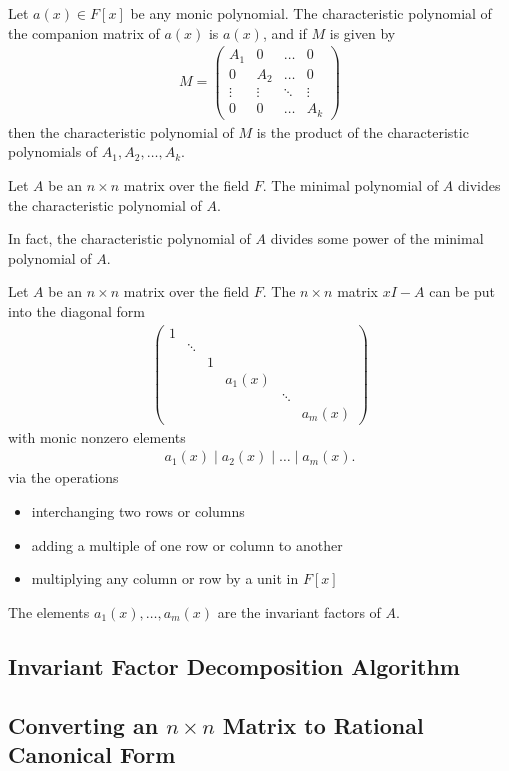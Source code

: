 \documentclass{memoir}
\begin{document}
\begin{lemma}
	Let \(a(x) \in F[x]\) be any monic polynomial. The characteristic polynomial of the companion matrix of \(a(x)\) is \(a(x)\), and if  \(M\) is given by
	\begin{align*}
		M = 
		\begin{pmatrix}
			A_1 & 0 & \ldots & 0 \\
			0 & A_2 & \ldots & 0\\
			\vdots & \vdots & \ddots & \vdots \\
			0 & 0 & \ldots & A_k
		\end{pmatrix} 
	\end{align*}
	then the characteristic polynomial of \(M\) is the product of the characteristic polynomials of \(A_1,A_2,\ldots,A_k\).
\end{lemma}

\begin{thm}
	Let \(A\) be an \(n\times n\) matrix over the field \(F\). The minimal polynomial of \(A\) divides the characteristic polynomial of \(A\).
\end{thm}
In fact, the characteristic polynomial of \(A\) divides some power of the minimal polynomial of \(A\).

\begin{thm}
	Let \(A\) be an \(n\times n\) matrix over the field \(F\). The \(n\times n\) matrix \(xI - A\) can be put into the diagonal form
	\begin{align*}
		\begin{pmatrix} 
			1 & & & & &\\
			  & \ddots & & & &\\
			  & & 1 & & &\\
			  & & & a_1(x) & &\\
			  & & & & \ddots & \\
			  & & & & & a_m(x)
		\end{pmatrix}
	\end{align*}
	with monic nonzero elements
	\begin{align*}
		a_1(x) \mid a_2(x) \mid \ldots \mid a_m(x).
	\end{align*}
	via the operations
	\begin{itemize}
		\item interchanging two rows or columns
		\item adding a multiple of one row or column to another
		\item multiplying any column or row by a unit in \(F[x]\)
	\end{itemize}
	The elements \(a_1(x),\ldots,a_m(x)\) are the invariant factors of \(A\).
\end{thm}

\subsection{Invariant Factor Decomposition Algorithm}
\label{sub:invariant_factor_decomposition_algorithm}


\subsection{Converting an \(n\times n\) Matrix to Rational Canonical Form}
\label{sub:converting_an_n_by_n_matrix_to_rational_canonical_form}


\end{document}
